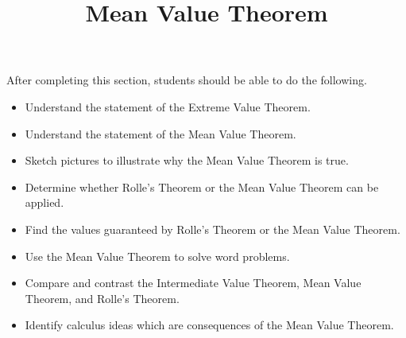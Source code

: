 \documentclass{ximera}
\title{Mean Value Theorem}
\begin{document}
\begin{abstract}
\end{abstract}

\maketitle

\begin{sectionOutcomes}

After completing this section, students should be able to do the following.

\begin{itemize}
\item Understand the statement of the Extreme Value Theorem.
\item Understand the statement of the Mean Value Theorem.
\item Sketch pictures to illustrate why the Mean Value Theorem is true.
\item Determine whether Rolle's Theorem or the Mean Value Theorem can be applied.
\item Find the values guaranteed by Rolle's Theorem or the Mean Value Theorem.
\item Use the Mean Value Theorem to solve word problems.
\item Compare and contrast the Intermediate Value Theorem, Mean Value Theorem, and Rolle's Theorem.
\item Identify calculus ideas which are consequences of the Mean Value Theorem.
\end{itemize}

\end{sectionOutcomes}
\end{document}

